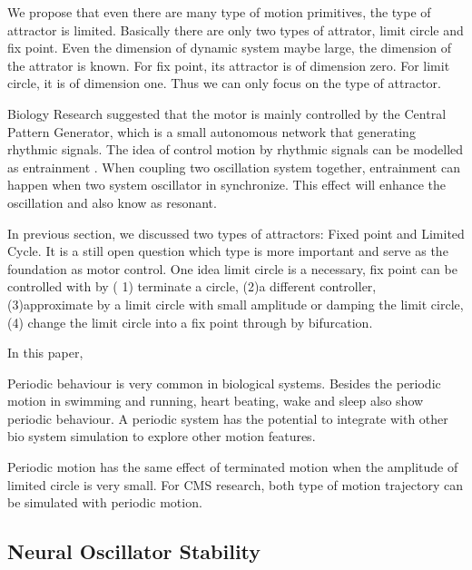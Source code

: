 We propose that even there are many type of motion primitives, the type of attractor is limited. Basically there are only two types of attrator, limit circle and fix point.
Even the dimension of dynamic system maybe large, the dimension of the attrator is known. 
For fix point, its attractor is of dimension zero.
For limit circle, it is of dimension one.
Thus we can only focus on the type of attractor.



Biology Research suggested that the motor is mainly controlled by the Central Pattern Generator, which is a small autonomous network that generating rhythmic signals.
The idea of control motion by rhythmic signals can be modelled as entrainment \citep{Gonz'alez-Miranda2004}.
When coupling two oscillation system together, entrainment can happen when two system oscillator in synchronize. 
This effect will enhance the oscillation and also know as resonant. 




In previous section, we discussed two types of attractors: Fixed point and Limited Cycle. 
It is a still open question which type is more important and serve as the foundation as motor control\citep{Degallier2010}.
One idea limit circle is a necessary, fix point can be controlled with by (
1) terminate a circle, 
(2)a different controller, 
(3)approximate by a limit circle with small amplitude or damping the limit circle, 
(4) change the limit circle into a fix point through by bifurcation. 



In this paper, 
\begin{itemize}
\HiItem Periodic behaviour is very common in biological systems. 
Besides the periodic motion in swimming and running, heart beating, wake and sleep also show periodic behaviour.
A periodic system has the potential to integrate with other bio system simulation to explore other motion features.

\HiItem Periodic motion has the same effect of terminated motion when the amplitude of limited circle is very small. 
For CMS research, both type of motion trajectory can be simulated with periodic motion.

\end{itemize}

\subsection{Neural Oscillator Stability}

